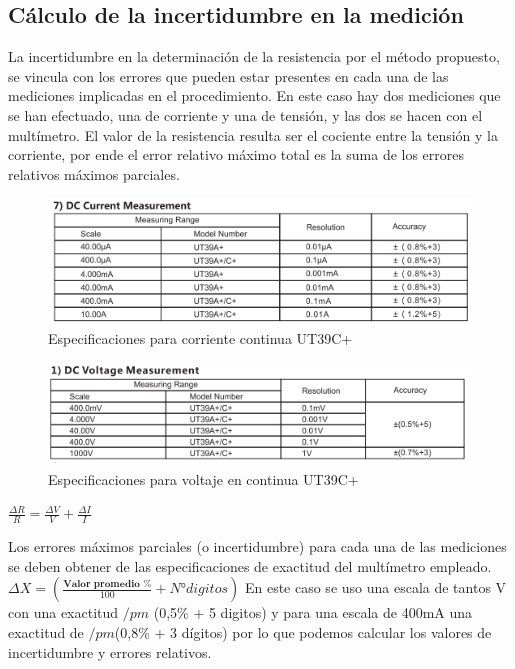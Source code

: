 \documentclass[12pt, letterpaper]{article}
\begin{document}
\subsection{Cálculo de la incertidumbre en la medición}

La incertidumbre en la determinación de la resistencia por el método propuesto, se vincula con los 
errores que pueden estar presentes en cada una de las mediciones implicadas en el procedimiento. En 
este caso hay dos mediciones que se han efectuado, una de corriente y una de tensión, y las dos se 
hacen con el multímetro. El valor de la resistencia resulta ser el cociente entre la tensión y la 
corriente, por ende el error relativo máximo total es la suma de los errores relativos máximos parciales.
\singlespacing
\begin{figure}[H]
		\centering
		\includegraphics{imagenes/DC_ut39c.png}
		\caption{Especificaciones para corriente continua UT39C+}
        \label{fig:DC_UT39C}
	\end{figure}
 \begin{figure}[H]
		\centering
		\includegraphics{imagenes/DV_ut39c.png}
		\caption{Especificaciones para voltaje en continua UT39C+}
        \label{fig:DV_UT39C}
	\end{figure}
$\frac{\Delta R}{R} = \frac{\Delta V}{V}+\frac{\Delta I}{I}$

\singlespacing
Los errores máximos parciales (o incertidumbre) para cada una de las mediciones se deben 
obtener de las especificaciones de exactitud del multímetro empleado. 
\singlespacing
$\Delta X=( \frac{\textbf{Valor promedio \%}}{100} + N° digitos)$
\singlespacing
En este caso se uso una escala de tantos V con una exactitud $/pm$ (0,5\% + 5 digitos) y para una escala de 400mA una exactitud de $/pm$(0,8\% + 3 dígitos)
por lo que podemos calcular los valores de incertidumbre y errores relativos.
\singlespacing  
\end{document}
